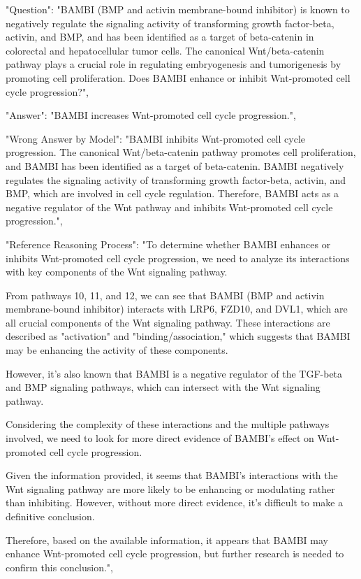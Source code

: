 \begin{tcolorbox}[breakable]
"Question": "BAMBI (BMP and activin membrane-bound inhibitor) is known to negatively regulate the signaling activity of transforming growth factor-beta, activin, and BMP, and has been identified as a target of beta-catenin in colorectal and hepatocellular tumor cells. The canonical Wnt/beta-catenin pathway plays a crucial role in regulating embryogenesis and tumorigenesis by promoting cell proliferation. Does BAMBI enhance or inhibit Wnt-promoted cell cycle progression?",

"Answer": "BAMBI increases Wnt-promoted cell cycle progression.",



"Wrong Answer by Model": "BAMBI inhibits Wnt-promoted cell cycle progression. The canonical Wnt/beta-catenin pathway promotes cell proliferation, and BAMBI has been identified as a target of beta-catenin. BAMBI negatively regulates the signaling activity of transforming growth factor-beta, activin, and BMP, which are involved in cell cycle regulation. Therefore, BAMBI acts as a negative regulator of the Wnt pathway and inhibits Wnt-promoted cell cycle progression.",



"Reference Reasoning Process": "To determine whether BAMBI enhances or inhibits Wnt-promoted cell cycle progression, we need to analyze its interactions with key components of the Wnt signaling pathway.

From pathways 10, 11, and 12, we can see that BAMBI (BMP and activin membrane-bound inhibitor) interacts with LRP6, FZD10, and DVL1, which are all crucial components of the Wnt signaling pathway. These interactions are described as "activation" and "binding/association," which suggests that BAMBI may be enhancing the activity of these components.

However, it's also known that BAMBI is a negative regulator of the TGF-beta and BMP signaling pathways, which can intersect with the Wnt signaling pathway. 

Considering the complexity of these interactions and the multiple pathways involved, we need to look for more direct evidence of BAMBI's effect on Wnt-promoted cell cycle progression.

Given the information provided, it seems that BAMBI's interactions with the Wnt signaling pathway are more likely to be enhancing or modulating rather than inhibiting. However, without more direct evidence, it's difficult to make a definitive conclusion.

Therefore, based on the available information, it appears that BAMBI may enhance Wnt-promoted cell cycle progression, but further research is needed to confirm this conclusion.",
\end{tcolorbox}
